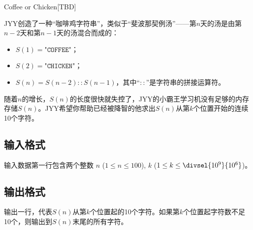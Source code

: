 \begin{Problem}{Coffee or Chicken}{[TBD]}

JYY创造了一种“咖啡鸡字符串”，类似于“斐波那契例汤”——第$n$天的汤是由第$n-2$天和第$n-1$天的汤混合而成的：

\begin{itemize}
  \item $S(1) = \texttt{"COFFEE"}$；
  \item $S(2) = \texttt{"CHICKEN"}$；
  \item $S(n) = S(n - 2) :: S(n - 1)$，其中“$::$”是字符串的拼接运算符。
\end{itemize}

随着$n$的增长，$S(n)$的长度很快就失控了，JYY的小霸王学习机没有足够的内存存储$S(n)$。JYY希望你帮助已经被降智的他求出$S(n)$从第$k$个位置开始的连续10个字符。

\subsection*{输入格式}

输入数据第一行包含两个整数 $n$ ($1\le n\le 100$), $k$ ($1\le k\le \divsel{10^9}{10^6}$)。

\subsection*{输出格式}

输出一行，代表$S(n)$从第$k$个位置起的10个字符。如果第$k$个位置起字符数不足10个，则输出到$S(n)$末尾的所有字符。


\end{Problem}
